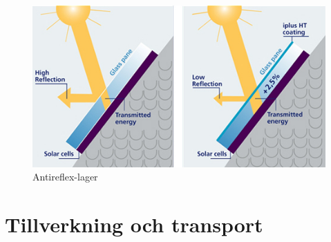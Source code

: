 \documentclass{article}
\begin{document}
\pagebreak

\begin{figure}[h]
	\centering
	\includegraphics[width=\linewidth]{reflexcoat}
	\caption{Antireflex-lager}
	\label{fig:refl1}
\end{figure}
\pagebreak
\section{Tillverkning och transport}
\end{document}
